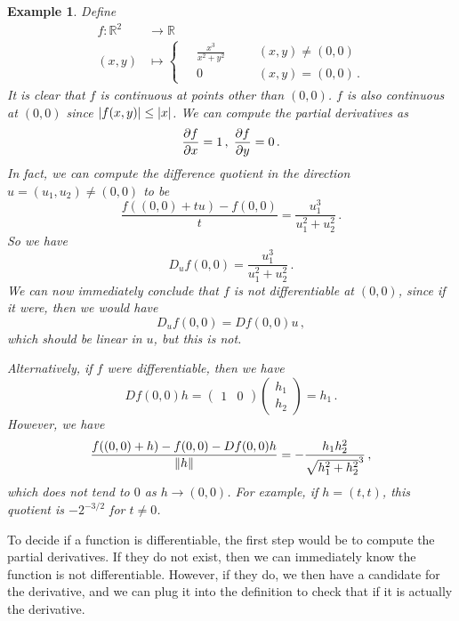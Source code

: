 \documentclass{article}
\theoremstyle{plain}\theoremheaderfont{\normalfont\itshape}\theorembodyfont{\rmfamily}\theoremseparator{.}\newtheorem*{rem}{Remark}\newtheorem*{ex}{Example}\newtheorem*{proof}{Proof}\newtheorem*{altp}{Alternative proof}
\theoremstyle{plain}\theoremheaderfont{\normalfont\bfseries}\theorembodyfont{\rmfamily}\theoremseparator{.}\newtheorem{thm}{Theorem}[section]\newtheorem{lem}[thm]{Lemma}\newtheorem{prop}[thm]{Proposition}\newtheorem*{cor}{Corollary}\newtheorem{defn}[thm]{Definition}\newtheorem{clm}[thm]{Claim}\newtheorem{clminproof}{Claim}
\theoremstyle{break}\theoremheaderfont{\normalfont\itshape}\theorembodyfont{\rmfamily}\theoremseparator{.\medskip}\newtheorem*{proofskip}{Proof}\newtheorem*{exs}{Examples}\newtheorem*{rems}{Remarks}
\theoremstyle{break}\theoremheaderfont{\normalfont\bfseries}\theorembodyfont{\rmfamily}\theoremseparator{.\medskip}\newtheorem{lemskip}[thm]{Lemma}\newtheorem{defnskip}[thm]{Definition}\newtheorem{propskip}[thm]{Proposition}\newtheorem{thmskip}[thm]{Theorem}
\begin{document}
    \begin{ex}
        Define
        \begin{align*}
            f:\mathbb{R}^2&\to\mathbb{R}\\
            (x,y)&\mapsto\left\{\begin{aligned}
                &\;\frac{x^3}{x^2+y^2} && \quad (x,y)\ne(0,0)\\
                &\;0 && \quad (x,y)=(0,0)\,.
            \end{aligned}\right.
        \end{align*}
        It is clear that \(f\) is continuous at points other than \((0,0)\). \(f\) is also continuous at \((0,0)\) since \(\abs{f(x,y)}\le\abs{x}\). We can compute the partial derivatives as
        \[\pdv{f}{x}(0,0)=1\,,\;\pdv{f}{y}(0,0)=0\,.\]
        In fact, we can compute the difference quotient in the direction \(u=(u_1,u_2)\ne(0,0)\) to be
        \[\frac{f((0,0)+tu)-f(0,0)}{t}=\frac{u_1^3}{u_1^2+u_2^2}\,.\]
        So we have
        \[D_uf(0,0)=\frac{u_1^3}{u_1^2+u_2^2}\,.\]
        We can now immediately conclude that \(f\) is not differentiable at \((0,0)\), since if it were, then we would have
        \[D_uf(0,0)=Df(0,0)u\,,\]
        which should be linear in \(u\), but this is not.

        Alternatively, if \(f\) were differentiable, then we have
        \[Df(0,0)h=\begin{pmatrix}
            1 & 0
        \end{pmatrix}\begin{pmatrix}
            h_1 \\ h_2
        \end{pmatrix}=h_1\,.\]
        However, we have
        \[\frac{f((0,0)+h)-f(0,0)-Df(0,0)h}{\norm{h}}=-\frac{h_1h_2^2}{\sqrt{h_1^2+h_2^2}^3}\,,\]
        which does not tend to \(0\) as \(h\to(0,0)\). For example, if \(h=(t,t)\), this quotient is \(-2^{-3/2}\) for \(t\ne 0\).
    \end{ex}
    
    To decide if a function is differentiable, the first step would be to compute the partial derivatives. If they do not exist, then we can immediately know the function is not differentiable. However, if they do, we then have a candidate for the derivative, and we can plug it into the definition to check that if it is actually the derivative.
\end{document}
